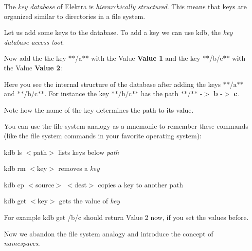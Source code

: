 The {\itshape key database} of Elektra is {\itshape hierarchically structured}. This means that keys are organized similar to directories in a file system.

Let us add some keys to the database. To add a key we can use {\ttfamily kdb}, the {\itshape key database access tool}\+:


\begin{DoxyCode}{0}
\end{DoxyCode}


Now add the the key $\ast$$\ast$/a$\ast$$\ast$ with the Value {\bfseries{Value 1}} and the key $\ast$$\ast$/b/c$\ast$$\ast$ with the Value {\bfseries{Value 2}}\+:


\begin{DoxyCode}{0}
\end{DoxyCode}




Here you see the internal structure of the database after adding the keys $\ast$$\ast$/a$\ast$$\ast$ and $\ast$$\ast$/b/c$\ast$$\ast$. For instance the key $\ast$$\ast$/b/c$\ast$$\ast$ has the path $\ast$$\ast$/$\ast$$\ast$ -\/$>$ {\bfseries{b}} -\/$>$ {\bfseries{c}}.

Note how the name of the key determines the path to its value.

You can use the file system analogy as a mnemonic to remember these commands (like the file system commands in your favorite operating system)\+:


\begin{DoxyItemize}
\item {\ttfamily kdb ls $<$path$>$} lists keys below {\itshape path}
\item {\ttfamily kdb rm $<$key$>$} removes a {\itshape key}
\item {\ttfamily kdb cp $<$source$>$ $<$dest$>$} copies a key to another path
\item {\ttfamily kdb get $<$key$>$} gets the value of {\itshape key}
\end{DoxyItemize}

For example {\ttfamily kdb get /b/c} should return {\ttfamily Value 2} now, if you set the values before.

Now we abandon the file system analogy and introduce the concept of {\itshape namespaces}.

